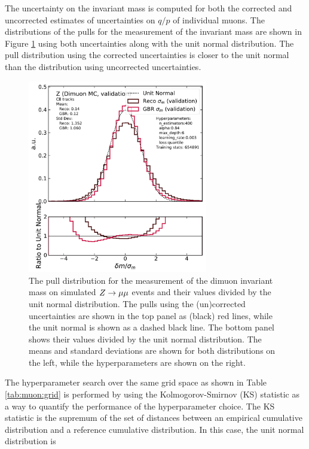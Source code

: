 The uncertainty on the invariant mass is computed for both the corrected
and uncorrected estimates of uncertainties on $q/p$ of individual muons.
The distributions of the pulls for the measurement of the invariant mass
are shown in Figure \ref{fig:muon:std-dimuon} using both uncertainties
along with the unit normal distribution. The pull distribution using the
corrected uncertainties is closer to the unit normal than the distribution
using uncorrected uncertainties.
\begin{figure}[h!]
  \centering
  \includegraphics[width=0.7\textwidth]{figures/muons/vader-std-dimuon}
  \caption[VADER4$\mu$ uncertainty correction on the dimuon dataset]
  {The pull distribution for the measurement of the dimuon invariant mass
  on simulated $Z \rightarrow \mu\mu$ events and their values divided by the unit normal
  distribution. The pulls using the (un)corrected uncertainties are shown in 
  the top panel as (black) red lines, while the unit normal is shown as a
  dashed black line. The bottom panel shows their values divided by the
  unit normal distribution. The means and standard deviations are shown for
  both distributions on the left, while the hyperparameters are shown on
  the right.
  }
  \label{fig:muon:std-dimuon}
\end{figure}
The hyperparameter search over the same grid space as shown in Table
\ref{tab:muon:grid} is performed by using the Kolmogorov-Smirnov (KS)
statistic \cite{ks-test} as a way to quantify the performance of the
hyperparameter choice. The KS statistic is the supremum of the set of
distances between an empirical cumulative distribution and a reference
cumulative distribution. In this case, the unit normal distribution is

